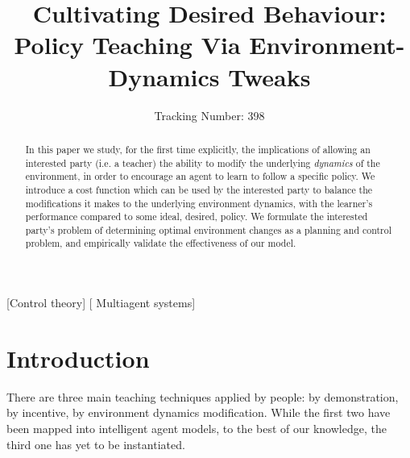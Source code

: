 \documentclass[letterpaper]{aamas2010}
\author{Tracking Number: 398}
\title{Cultivating Desired Behaviour:\\ Policy Teaching Via Environment-Dynamics Tweaks}
\begin{document}
\maketitle

\begin{abstract}

In this paper we study, for the first time explicitly, the
implications of allowing an interested party (i.e. a teacher) the
ability to modify the underlying \emph{dynamics} of the environment,
in order to encourage an agent to learn to follow a specific
policy. We introduce a cost function which can be used by the
interested party to balance the modifications it makes to the
underlying environment dynamics, with the learner's performance
compared to some ideal, desired, policy. We formulate the interested
party's problem of determining optimal environment changes as a
planning and control problem, and empirically validate the
effectiveness of our model.
\end{abstract}

[Control theory]
[
Multiagent systems]

\section{Introduction}

There are three main teaching techniques applied by people: by
demonstration, by incentive, by environment dynamics
modification. While the
first two have been mapped into intelligent agent models, to the best
of our knowledge, the third one has yet to be instantiated.
\end{document}

